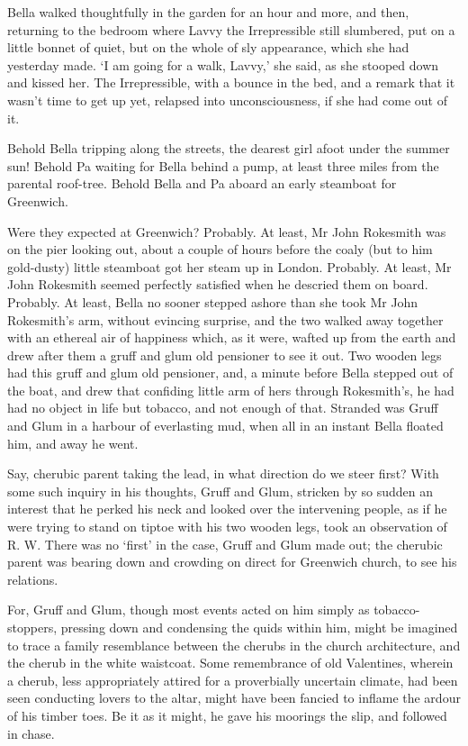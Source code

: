 Bella walked thoughtfully in the garden for an hour and more, and then,
returning to the bedroom where Lavvy the Irrepressible still slumbered,
put on a little bonnet of quiet, but on the whole of sly appearance,
which she had yesterday made. ‘I am going for a walk, Lavvy,’ she said,
as she stooped down and kissed her. The Irrepressible, with a bounce in
the bed, and a remark that it wasn’t time to get up yet, relapsed into
unconsciousness, if she had come out of it.

Behold Bella tripping along the streets, the dearest girl afoot under
the summer sun! Behold Pa waiting for Bella behind a pump, at least
three miles from the parental roof-tree. Behold Bella and Pa aboard an
early steamboat for Greenwich.

Were they expected at Greenwich? Probably. At least, Mr John Rokesmith
was on the pier looking out, about a couple of hours before the coaly
(but to him gold-dusty) little steamboat got her steam up in London.
Probably. At least, Mr John Rokesmith seemed perfectly satisfied when
he descried them on board. Probably. At least, Bella no sooner stepped
ashore than she took Mr John Rokesmith’s arm, without evincing surprise,
and the two walked away together with an ethereal air of happiness
which, as it were, wafted up from the earth and drew after them a gruff
and glum old pensioner to see it out. Two wooden legs had this gruff and
glum old pensioner, and, a minute before Bella stepped out of the boat,
and drew that confiding little arm of hers through Rokesmith’s, he had
had no object in life but tobacco, and not enough of that. Stranded was
Gruff and Glum in a harbour of everlasting mud, when all in an instant
Bella floated him, and away he went.

Say, cherubic parent taking the lead, in what direction do we steer
first? With some such inquiry in his thoughts, Gruff and Glum, stricken
by so sudden an interest that he perked his neck and looked over the
intervening people, as if he were trying to stand on tiptoe with his two
wooden legs, took an observation of R. W. There was no ‘first’ in the
case, Gruff and Glum made out; the cherubic parent was bearing down and
crowding on direct for Greenwich church, to see his relations.

For, Gruff and Glum, though most events acted on him simply as
tobacco-stoppers, pressing down and condensing the quids within him,
might be imagined to trace a family resemblance between the cherubs in
the church architecture, and the cherub in the white waistcoat. Some
remembrance of old Valentines, wherein a cherub, less appropriately
attired for a proverbially uncertain climate, had been seen conducting
lovers to the altar, might have been fancied to inflame the ardour of
his timber toes. Be it as it might, he gave his moorings the slip, and
followed in chase.

